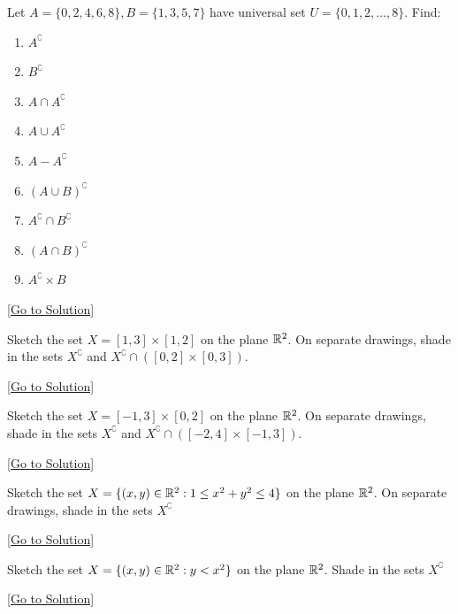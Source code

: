 \begin{exercise}\label{ex:6.2}
    Let $A=\{ 0,2,4,6,8 \}, B=\{ 1,3,5,7 \}$ have universal set $U=\{ 0,1,2,\dots,8 \}$. Find: 
    \begin{enumerate}
        \item $A^{\complement}$
        \item $B^{\complement}$
        \item $A\cap A^{\complement}$
        \item $A\cup A^{\complement}$
        \item $A-A^{\complement}$
        \item $(A\cup B)^{\complement}$
        \item $A^{\complement}\cap B^{\complement}$
        \item $(A\cap B)^{\complement}$
        \item $A^{\complement}\times B$
    \end{enumerate}
\end{exercise}\hyperref[sol:6.2]{[Go to Solution]}

\begin{exercise}\label{ex:6.3}
    Sketch the set $X=[1,3]\times[1,2]$ on the plane $\mathbb{R}^{2}$. On separate drawings, shade in the sets $X^{\complement}$ and $X^{\complement}\cap([0,2]\times[0,3])$.
\end{exercise}\hyperref[sol:6.3]{[Go to Solution]}

\begin{exercise}\label{ex:6.4}
    Sketch the set $X=[-1,3]\times[0,2]$ on the plane $\mathbb{R}^{2}$. On separate drawings, shade in the sets $X^{\complement}$ and $X^{\complement}\cap([-2,4]\times[-1,3])$.
\end{exercise}\hyperref[sol:6.4]{[Go to Solution]}

\begin{exercise}\label{ex:6.5}
    Sketch the set $X=\{ (x,y)\in\mathbb{R}^{2}:1\le x^{2}+y^{2}\le 4 \}$ on the plane $\mathbb{R}^{2}$. On separate drawings, shade in the sets $X^{\complement}$
\end{exercise}\hyperref[sol:6.5]{[Go to Solution]}

\begin{exercise}\label{ex:6.6}
    Sketch the set $X=\{ (x,y)\in\mathbb{R}^{2}:y<x^{2}\}$ on the plane $\mathbb{R}^{2}$. Shade in the sets $X^{\complement}$
\end{exercise}\hyperref[sol:6.6]{[Go to Solution]}